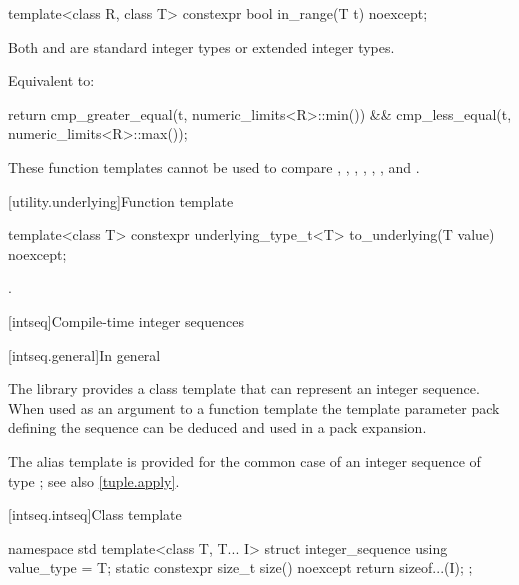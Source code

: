 %
\begin{itemdecl}
template<class R, class T>
  constexpr bool in_range(T t) noexcept;
\end{itemdecl}

\begin{itemdescr}
\pnum
\mandates
Both  and  are standard integer types or
extended integer types.

\pnum
\effects
Equivalent to:
\begin{codeblock}
return cmp_greater_equal(t, numeric_limits<R>::min()) &&
       cmp_less_equal(t, numeric_limits<R>::max());
\end{codeblock}
\end{itemdescr}

\pnum
\begin{note}
These function templates cannot be used to compare
,
,
,
,
,
, and
.
\end{note}

[utility.underlying]{Function template }

\begin{itemdecl}
template<class T>
  constexpr underlying_type_t<T> to_underlying(T value) noexcept;
\end{itemdecl}

\begin{itemdescr}
\pnum
\returns
{}.
\end{itemdescr}


[intseq]{Compile-time integer sequences}

[intseq.general]{In general}

\pnum
The library provides a class template that can represent an integer sequence.
When used as an argument to a function template the template parameter pack defining the
sequence can be deduced and used in a pack expansion.
\begin{note}
The  alias template is provided for the common case of
an integer sequence of type ; see also \ref{tuple.apply}.
\end{note}

[intseq.intseq]{Class template }

%
%
\begin{codeblock}
namespace std {
  template<class T, T... I> struct integer_sequence {
    using value_type = T;
    static constexpr size_t size() noexcept { return sizeof...(I); }
  };
}
\end{codeblock}

